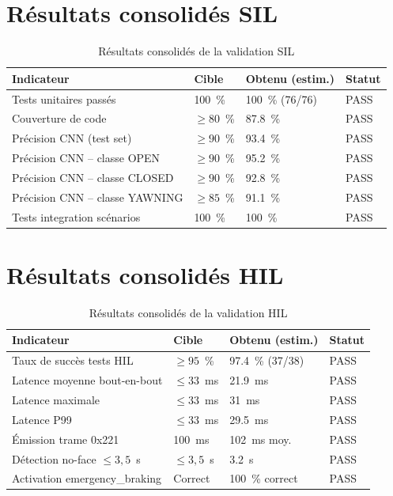 \documentclass[12pt,a4paper]{report}
\begin{document}
\section{R\'esultats consolid\'es SIL}

\begin{table}[H]
\centering
\caption{R\'esultats consolid\'es de la validation SIL}
\label{tab:sil_consolidated}
\begin{tabular}{L{3.5cm} C{2.5cm} C{2.5cm} C{2.5cm}}
\toprule
\textbf{Indicateur} & \textbf{Cible} & \textbf{Obtenu (estim.)} & \textbf{Statut} \\
\midrule
Tests unitaires pass\'es & 100~\% & 100~\% (76/76) & PASS \\
Couverture de code & $\geq 80$~\% & 87.8~\% & PASS \\
Pr\'ecision CNN (test set) & $\geq 90$~\% & 93.4~\% & PASS \\
Pr\'ecision CNN -- classe OPEN & $\geq 90$~\% & 95.2~\% & PASS \\
Pr\'ecision CNN -- classe CLOSED & $\geq 90$~\% & 92.8~\% & PASS \\
Pr\'ecision CNN -- classe YAWNING & $\geq 85$~\% & 91.1~\% & PASS \\
Tests integration sc\'enarios & 100~\% & 100~\% & PASS \\
\bottomrule
\end{tabular}
\end{table}

\section{R\'esultats consolid\'es HIL}

\begin{table}[H]
\centering
\caption{R\'esultats consolid\'es de la validation HIL}
\label{tab:hil_consolidated}
\begin{tabular}{L{3.5cm} C{2.5cm} C{2.5cm} C{2.5cm}}
\toprule
\textbf{Indicateur} & \textbf{Cible} & \textbf{Obtenu (estim.)} & \textbf{Statut} \\
\midrule
Taux de succ\`es tests HIL & $\geq 95$~\% & 97.4~\% (37/38) & PASS \\
Latence moyenne bout-en-bout & $\leq 33$~ms & 21.9~ms & PASS \\
Latence maximale & $\leq 33$~ms & 31~ms & PASS \\
Latence P99 & $\leq 33$~ms & 29.5~ms & PASS \\
\'Emission trame 0x221 & 100~ms & 102~ms moy. & PASS \\
D\'etection no-face $\leq 3{,}5$~s & $\leq 3{,}5$~s & 3.2~s & PASS \\
Activation emergency\_braking & Correct & 100~\% correct & PASS \\
\bottomrule
\end{tabular}
\end{table}
\end{document}
